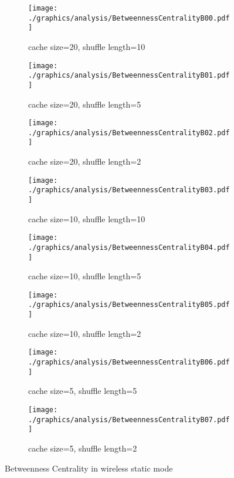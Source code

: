 \begin{figure}
\begin{subfigure}{.5\textwidth}
	\texttt{[image: ./graphics/analysis/BetweennessCentralityB00.pdf]}
	\caption{cache size=20, shuffle
	length=10}
	\label{fig:betweennessCentralityB00small}
\end{subfigure}%
\begin{subfigure}{.5\textwidth}
	\texttt{[image: ./graphics/analysis/BetweennessCentralityB01.pdf]}
	\caption{cache size=20, shuffle
	length=5}
	\label{fig:betweennessCentralityB01small}
\end{subfigure}
\begin{subfigure}{.5\textwidth}
	\texttt{[image: ./graphics/analysis/BetweennessCentralityB02.pdf]}
	\caption{cache size=20, shuffle
	length=2}
	\label{fig:betweennessCentralityB02small}
\end{subfigure}%
\begin{subfigure}{.5\textwidth}
	\texttt{[image: ./graphics/analysis/BetweennessCentralityB03.pdf]}
	\caption{cache size=10, shuffle
	length=10}
	\label{fig:betweennessCentralityB03small}
\end{subfigure}
\begin{subfigure}{.5\textwidth}
	\texttt{[image: ./graphics/analysis/BetweennessCentralityB04.pdf]}
	\caption{cache size=10, shuffle
	length=5}
	\label{fig:betweennessCentralityB04small}
\end{subfigure}%
\begin{subfigure}{.5\textwidth}
	\texttt{[image: ./graphics/analysis/BetweennessCentralityB05.pdf]}
	\caption{cache size=10, shuffle
	length=2}
	\label{fig:betweennessCentralityB05small}
\end{subfigure}
\begin{subfigure}{.5\textwidth}
	\texttt{[image: ./graphics/analysis/BetweennessCentralityB06.pdf]}
	\caption{cache size=5, shuffle
	length=5}
	\label{fig:betweennessCentralityB06small}
\end{subfigure}%
\begin{subfigure}{.5\textwidth}
	\texttt{[image: ./graphics/analysis/BetweennessCentralityB07.pdf]}
	\caption{cache size=5, shuffle
	length=2}
	\label{fig:betweennessCentralityB07small}
\end{subfigure}
\caption{Betweenness Centrality in wireless static mode}
\end{figure}



